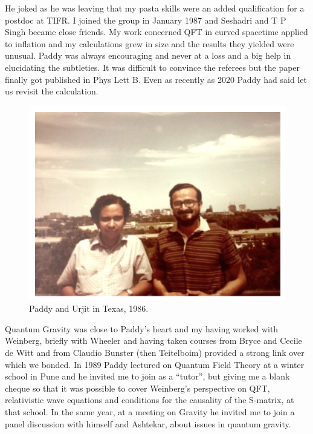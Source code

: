 \documentclass[prd, preprint, longbibliography, 12pt]{revtex4-2}
\begin{document}
He joked as he was leaving that my pasta skills were an added qualification for a postdoc at TIFR. I joined the group in January 1987 and Seshadri and T P Singh became close friends. My work concerned QFT in curved spacetime applied to inflation and my calculations grew in size and the results they yielded were unusual. Paddy was always encouraging and never at a loss and a big help in elucidating the subtleties. It was difficult to convince the referees but the paper finally got published in Phys Lett B. Even as recently as 2020 Paddy had said let us revisit the calculation.
\begin{figure}[!h]
\centering
\includegraphics[width=12.00cm]{urjittexa.png}
\caption*{Paddy and Urjit in Texas, 1986.} 
\end{figure}
Quantum Gravity was close to Paddy’s heart and my having worked with Weinberg, briefly with Wheeler and having taken courses from Bryce and Cecile de Witt and from Claudio Bunster (then Teitelboim) provided a strong link over which we bonded.  In 1989 Paddy lectured on Quantum Field Theory at a winter school in Pune and he invited me to join as a “tutor”, but giving me a blank cheque so that it was possible to cover Weinberg’s perspective on QFT, relativistic wave equations and conditions for the causality of the S-matrix, at that school.  In the same year, at a meeting on Gravity he invited me to join a panel discussion with himself and Ashtekar, about issues in quantum gravity.  
\end{document}
